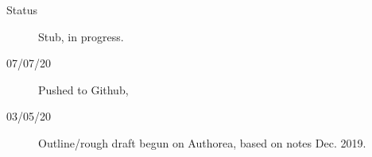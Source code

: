 \begin{description}
\item [{Status}] Stub, in progress.
\item [{07/07/20}] Pushed to Github, \href{http://}{}
\item [{03/05/20}] Outline/rough draft begun on Authorea, based on notes Dec. 2019.
\end{description}